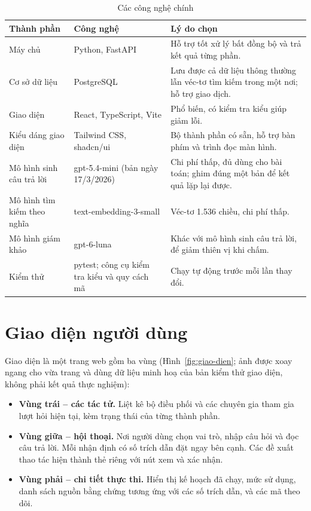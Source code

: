 \begin{table}[!htbp]
\caption{Các công nghệ chính}
\label{tab:cong-nghe}
\cobang
\begin{tabularx}{\linewidth}{P{3.6cm}P{4.6cm}Y}
\toprule
\textbf{Thành phần} & \textbf{Công nghệ} & \textbf{Lý do chọn}\\
\midrule
Máy chủ & Python, FastAPI & Hỗ trợ tốt xử lý bất đồng bộ và trả kết quả từng phần.\\
Cơ sở dữ liệu & PostgreSQL & Lưu được cả dữ liệu thông thường lẫn véc-tơ tìm kiếm trong một nơi; hỗ trợ giao dịch.\\
Giao diện & React, TypeScript, Vite & Phổ biến, có kiểm tra kiểu giúp giảm lỗi.\\
Kiểu dáng giao diện & Tailwind CSS, shadcn/ui & Bộ thành phần có sẵn, hỗ trợ bàn phím và trình đọc màn hình.\\
Mô hình sinh câu trả lời & gpt-5.4-mini (bản ngày 17/3/2026) & Chi phí thấp, đủ dùng cho bài toán; ghim đúng một bản để kết quả lặp lại được.\\
Mô hình tìm kiếm theo nghĩa & text-embedding-3-small & Véc-tơ 1.536 chiều, chi phí thấp.\\
Mô hình giám khảo & gpt-6-luna & Khác với mô hình sinh câu trả lời, để giảm thiên vị khi chấm.\\
Kiểm thử & pytest; công cụ kiểm tra kiểu và quy cách mã & Chạy tự động trước mỗi lần thay đổi.\\
\bottomrule
\end{tabularx}
\end{table}

\section{Giao diện người dùng}

Giao diện là một trang web gồm ba vùng (Hình~\ref{fig:giao-dien}; ảnh được xoay ngang cho vừa trang và dùng dữ liệu minh hoạ của bản kiểm thử giao diện, không phải kết quả thực nghiệm):

\begin{itemize}
    \item \textbf{Vùng trái -- các tác tử.} Liệt kê bộ điều phối và các chuyên gia tham gia lượt hỏi hiện tại, kèm trạng thái của từng thành phần.
    \item \textbf{Vùng giữa -- hội thoại.} Nơi người dùng chọn vai trò, nhập câu hỏi và đọc câu trả lời. Mỗi nhận định có số trích dẫn đặt ngay bên cạnh. Các đề xuất thao tác hiện thành thẻ riêng với nút xem và xác nhận.
    \item \textbf{Vùng phải -- chi tiết thực thi.} Hiển thị kế hoạch đã chạy, mức sử dụng, danh sách nguồn bằng chứng tương ứng với các số trích dẫn, và các mã theo dõi.
\end{itemize}

